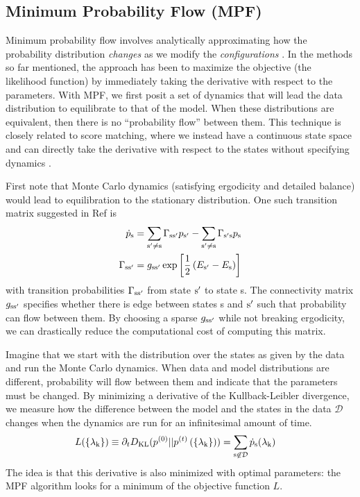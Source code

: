 \documentclass{jors}
\begin{document}
\subsection*{Minimum Probability Flow (MPF)}
Minimum probability flow involves analytically approximating how the probability distribution \textit{changes} as we modify the \textit{configurations} \cite{Sohl-Dickstein:2009tt,SohlDickstein:2011im}. In the methods so far mentioned, the approach has been to maximize the objective (the likelihood function) by immediately taking the derivative with respect to the parameters. With MPF, we first posit a set of dynamics that will lead the data distribution to equilibrate to that of the model. When these distributions are equivalent, then there is no ``probability flow'' between them. This technique is closely related to score matching, where we instead have a continuous state space and can directly take the derivative with respect to the states without specifying dynamics \cite{Hyvarinen:2007ed}.

First note that Monte Carlo dynamics (satisfying ergodicity and detailed balance) would lead to equilibration to the stationary distribution. One such transition matrix suggested in Ref \cite{SohlDickstein:2011im} is
\begin{align}
	\dot{p}_{\rm s} &= \sum_{\rm s'\neq s} \Gamma_{\rm ss'} p_{\rm s'} -\sum_{\rm s'\neq s} \Gamma_{\rm s's} p_{\rm s}\\
	\Gamma_{\rm ss'} &= g_{\rm ss'}\exp\left[ \frac{1}{2}\left( E_{\rm s'}-E_{\rm s} \right) \right]
\end{align}
with transition probabilities $\Gamma_{\rm ss'}$ from state ${\rm s'}$ to state s. The connectivity matrix $g_{\rm ss'}$ specifies whether there is edge between states s and ${\rm s'}$ such that probability can flow between them. By choosing a sparse $g_{\rm ss'}$ while not breaking ergodicity, we can drastically reduce the computational cost of computing this matrix.

Imagine that we start with the distribution over the states as given by the data and run the Monte Carlo dynamics. When data and model distributions are different, probability will flow between them and indicate that the parameters must be changed.  By minimizing a derivative of the Kullback-Leibler divergence, we measure how the difference between the model and the states in the data $\mathcal{D}$ changes when the dynamics are run for an infinitesimal amount of time.
\begin{align}
	L(\{\lambda_{\rm k}\}) \equiv \partial_t D_{\rm KL}(p^{(0)}||p^{(t)}\left(\{\lambda_{\rm k}\}\right)) &= \sum_{\rm s \not\in \mathcal{D}} \dot{p}_{\rm s}(\lambda_{\rm k})
\end{align}
The idea is that this derivative is also minimized with optimal parameters: the MPF algorithm looks for a minimum of the objective function $L$.
\end{document}
